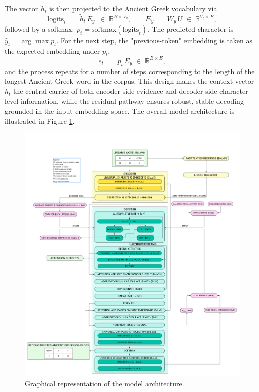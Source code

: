 The vector $\tilde{h}_t$ is then projected to the Ancient Greek vocabulary via
\[
\text{logits}_t \;=\; \tilde{h}_t\,E_y^{\top}\;\in\;\mathbb{R}^{B\times V_g},
\qquad
E_y \;=\; W_y\,U \;\in\; \mathbb{R}^{V_g\times E},
\]
followed by a softmax: $p_t=\mathrm{softmax}(\text{logits}_t)$.
The predicted character is $\hat{y}_t=\arg\max p_t$.
For the next step, the "previous-token" embedding is taken as the expected
embedding under $p_t$,
\[
e_t \;=\; p_t\,E_y \;\in\; \mathbb{R}^{B\times E},
\]
and the process repeats for a number of steps corresponding to the length of the longest Ancient Greek word in the corpus.
This design makes the context vector $\tilde{h}_t$ the central carrier of
both encoder-side evidence and decoder-side character-level information, while the residual pathway
ensures robust, stable decoding grounded in the input embedding space.
The overall model architecture is illustrated in Figure \ref{fig:luo_model}.
\begin{figure}[H]
    \centering
    \includegraphics[width=1.2\textwidth]{Images/luo_model.png} %
    \caption{Graphical representation of the model architecture.}
    \label{fig:luo_model}
\end{figure}

